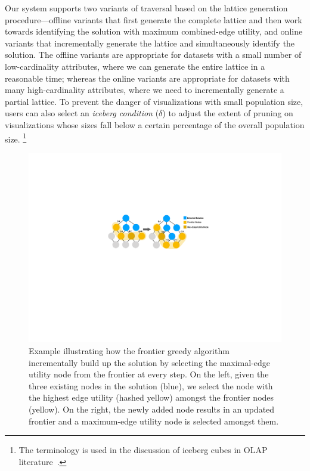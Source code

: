 Our system supports two variants of traversal based on the lattice generation procedure---offline variants that first generate the complete lattice and then work towards identifying the solution with maximum combined-edge utility, and online variants that incrementally generate the lattice and simultaneously identify the solution. The offline variants are appropriate for datasets with a small number of low-cardinality attributes, where we can generate the entire lattice in a reasonable time; whereas the online variants are appropriate for datasets with many high-cardinality attributes, where we need to incrementally generate a partial lattice. To prevent the danger of visualizations with small population size, users can also select an \textit{iceberg condition} ($\delta$) to adjust the extent of pruning on visualizations whose sizes fall below a certain percentage of the overall population size. \footnote{The terminology is used in the discussion of iceberg cubes in OLAP literature~\cite{Xin2007}.}
\begin{figure}[h!]
\centering
\includegraphics[width=\linewidth]{figures/frontier_greedy.pdf}
\caption{Example illustrating how the frontier greedy algorithm incrementally build up the solution by selecting the maximal-edge utility node from the frontier at every step. On the left, given the three existing nodes in the solution (blue), we select the node with the highest edge utility (hashed yellow) amongst the frontier nodes (yellow). On the right, the newly added node results in an updated frontier and a maximum-edge utility node is selected amongst them.} 
\label{fig:frontier_greedy}
\end{figure}
